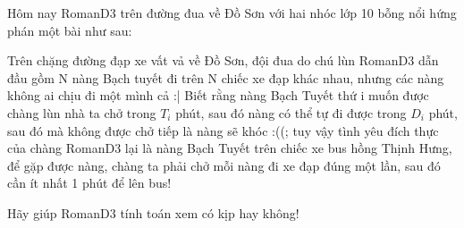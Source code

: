 Hôm nay RomanD3 trên đường đua về Đồ Sơn với hai nhóc lớp 10 bỗng nổi hứng phán một bài như sau:  

   Trên chặng đường đạp xe vất vả về Đồ Sơn, đội đua do chú lùn RomanD3 dẫn đầu gồm N nàng Bạch tuyết đi trên N chiếc xe đạp khác nhau, nhưng các nàng không ai chịu đi một mình cả :| Biết rằng nàng Bạch Tuyết thứ i muốn được chàng lùn nhà ta chở trong $T_{i}$   phút, sau đó nàng có thể tự đi được trong $D_{i}$   phút, sau đó mà không được chở tiếp là nàng sẽ khóc :((; tuy vậy tình yêu đích thực của chàng RomanD3 lại là nàng Bạch Tuyết trên chiếc xe bus hồng Thịnh Hưng, để gặp được nàng, chàng ta phải chở mỗi nàng đi xe đạp đúng một lần, sau đó cần ít nhất 1 phút để lên bus!  

   Hãy giúp RomanD3 tính toán xem có kịp hay không!